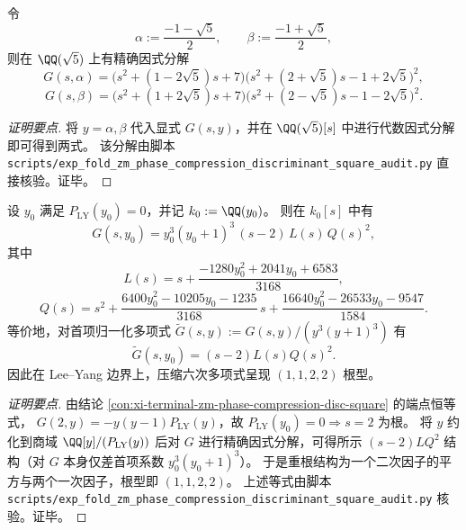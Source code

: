 \begin{conclusion}[黄金比例判别式分量的显式平方塌缩]\label{con:xi-terminal-zm-phase-compression-golden-square-collapse}
令
\[
\alpha:=\frac{-1-\sqrt5}{2},\qquad
\beta:=\frac{-1+\sqrt5}{2},
\]
则在 \(\QQ(\sqrt5)\) 上有精确因式分解
\[
G(s,\alpha)=\bigl(s^2+(1-2\sqrt5)s+7\bigr)\bigl(s^2+(2+\sqrt5)s-1+2\sqrt5\bigr)^2,
\]
\[
G(s,\beta)=\bigl(s^2+(1+2\sqrt5)s+7\bigr)\bigl(s^2+(2-\sqrt5)s-1-2\sqrt5\bigr)^2.
\]
\end{conclusion}
\begin{proof}[证明要点]
将 \(y=\alpha,\beta\) 代入显式 \(G(s,y)\)，并在 \(\QQ(\sqrt5)[s]\) 中进行代数因式分解即可得到两式。
该分解由脚本 \texttt{scripts/exp\_fold\_zm\_phase\_compression\_discriminant\_square\_audit.py} 直接核验。证毕。
\end{proof}

\begin{conclusion}\label{con:xi-terminal-zm-phase-compression-leyang-double-resonance-pairs}
设 \(y_0\) 满足 \(P_{\mathrm{LY}}(y_0)=0\)，并记 \(k_0:=\QQ(y_0)\)。
则在 \(k_0[s]\) 中有
\[
G(s,y_0)=y_0^3(y_0+1)^3\,(s-2)\,L(s)\,Q(s)^2,
\]
其中
\[
L(s)=s+\frac{-1280y_0^2+2041y_0+6583}{3168},
\]
\[
Q(s)=s^2+\frac{6400y_0^2-10205y_0-1235}{3168}\,s+\frac{16640y_0^2-26533y_0-9547}{1584}.
\]
等价地，对首项归一化多项式 \(\widetilde G(s,y):=G(s,y)/(y^3(y+1)^3)\) 有
\[
\widetilde G(s,y_0)=(s-2)L(s)Q(s)^2.
\]
因此在 Lee--Yang 边界上，压缩六次多项式呈现 \((1,1,2,2)\) 根型。
\end{conclusion}
\begin{proof}[证明要点]
由结论 \ref{con:xi-terminal-zm-phase-compression-disc-square} 的端点恒等式，
\(
G(2,y)=-y(y-1)P_{\mathrm{LY}}(y)
\)，故 \(P_{\mathrm{LY}}(y_0)=0\Rightarrow s=2\) 为根。
将 \(y\) 约化到商域 \(\QQ[y]/(P_{\mathrm{LY}}(y))\) 后对 \(G\) 进行精确因式分解，可得所示
\((s-2)LQ^2\) 结构（对 \(G\) 本身仅差首项系数 \(y_0^3(y_0+1)^3\)）。
于是重根结构为一个二次因子的平方与两个一次因子，根型即 \((1,1,2,2)\)。
上述等式由脚本 \texttt{scripts/exp\_fold\_zm\_phase\_compression\_discriminant\_square\_audit.py} 核验。证毕。
\end{proof}

